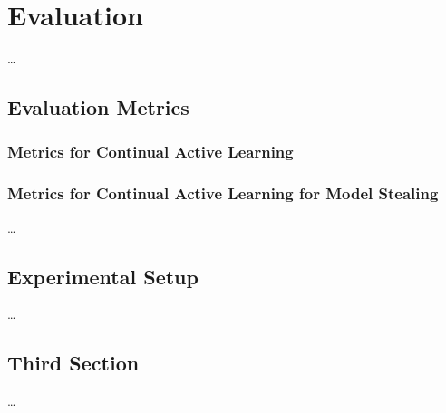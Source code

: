 
\chapter{Evaluation}
\label{ch:Evaluation}

\dots

\section{Evaluation Metrics}
\label{sec:Evaluation:Metrics}

\subsection{Metrics for Continual Active Learning}
\label{sec:Evaluation:Metrics:CAL}

\subsection{Metrics for Continual Active Learning for Model Stealing}
\label{sec:Evaluation:Metrics:CALMS}

\dots

\section{Experimental Setup}
\label{sec:Evaluation:Setup}

\dots


\section{Third Section}
\label{sec:Evaluation:ThirdSection}

\dots
